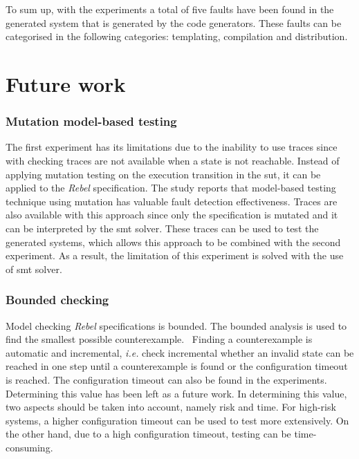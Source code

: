 To sum up, with the experiments a total of five faults have been found in the
generated system that is generated by the code generators.
These faults can be categorised in the following categories: templating,
compilation and distribution.

\clearpage

\section{Future work}

\subsubsection{Mutation model-based testing}

The first experiment has its limitations due to the inability to use traces
since with checking traces are not available when a state is not reachable.
Instead of applying mutation testing on the execution transition in the
\gls{sut}, it can be applied to the \textit{Rebel} specification.
The study \cite{paradkar2005case} reports that model-based testing technique
using mutation has valuable fault detection effectiveness.
Traces are also available with this approach since only the specification is
mutated and it can be interpreted by the \gls{smt} solver.
These traces can be used to test the generated systems, which allows this
approach to be combined with the second experiment. As a result, the limitation
of this experiment is solved with the use of \gls{smt} solver.

\subsubsection{Bounded checking}

Model checking \textit{Rebel} specifications is bounded. The bounded analysis is
used to find the smallest possible counterexample.~\cite[p.~5]{stoel_storm_vinju_bosman_2016}
Finding a counterexample is automatic and incremental,
\textit{i.e.} check incremental whether an invalid state can be reached in one
step until a counterexample is found or the configuration timeout is reached.
The configuration timeout can also be found in the experiments.
Determining this value has been left as a future work.
In determining this value, two aspects should be taken into account,
namely risk and time. For high-risk systems, a higher configuration timeout can
be used to test more extensively. On the other hand, due to a high configuration
timeout, testing can be time-consuming.


